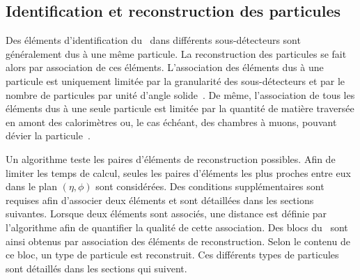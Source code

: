 \subsection{Identification et reconstruction des particules}\label{chapter-LHC-section-evt_reco-subsec-ptc_ID}
Des éléments d'identification du \PF\ dans différents sous-détecteurs sont généralement dus à une même particule.
La reconstruction des particules se fait alors par association de ces éléments.
L'association des éléments dus à une particule est uniquement limitée par la granularité des sous-détecteurs et par le nombre de particules par unité d'angle solide~\cite{particle-flow}.
De même, l'association de tous les éléments dus à une seule particule est limitée par la quantité de matière traversée en amont des calorimètres ou, le cas échéant, des chambres à muons, pouvant dévier la particule~\cite{moliere_scat_1,moliere_scat_2}.
\par Un algorithme teste les paires d'éléments de reconstruction possibles.
Afin de limiter les temps de calcul, seules les paires d'éléments les plus proches entre eux dans le plan $(\eta,\phi)$ sont considérées.
Des conditions supplémentaires sont requises afin d'associer deux éléments et sont détaillées dans les sections suivantes.
Lorsque deux éléments sont associés, une distance est définie par l'algorithme afin de quantifier la qualité de cette association.
Des \og blocs \fg{} du \PF\ sont ainsi obtenus par association des éléments de reconstruction.
Selon le contenu de ce bloc, un type de  particule est reconstruit.
Ces différents types de particules sont détaillés dans les sections qui suivent.
